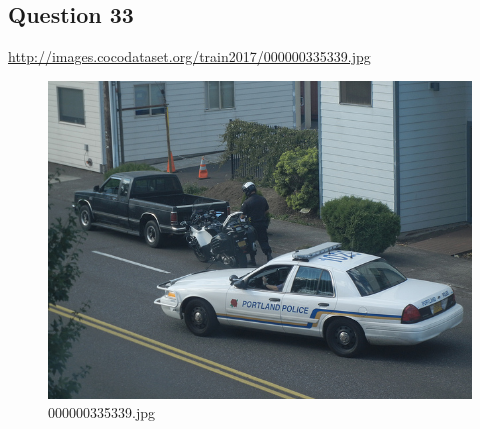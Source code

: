 \subsection*{Question 33}
\url{http://images.cocodataset.org/train2017/000000335339.jpg}
    \begin{figure}[h]
        \centering
        \includegraphics[width=0.8\linewidth]{../image set/easy/000000335339.jpg}
        \caption{000000335339.jpg}
    \end{figure} 
